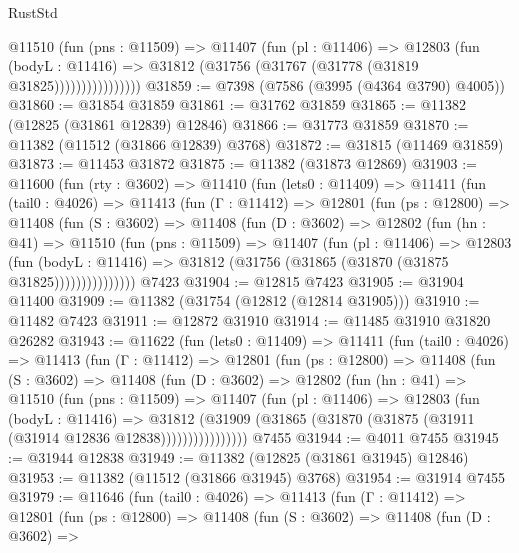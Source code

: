 \begin{lexlean}{RustStd}
\begin{coremodule}
                    @11510
                      (fun (pns : @11509) =>
                      @11407
                        (fun (pl : @11406) =>
                        @12803
                          (fun (bodyL : @11416) =>
                          @31812 (@31756 (@31767 (@31778 (@31819 @31825))))))))))))))))
@31859 := @7398 (@7586 (@3995 (@4364 @3790) @4005))
@31860 := @31854 @31859
@31861 := @31762 @31859
@31865 := @11382 (@12825 (@31861 @12839) @12846)
@31866 := @31773 @31859
@31870 := @11382 (@11512 (@31866 @12839) @3768)
@31872 := @31815 (@11469 @31859)
@31873 := @11453 @31872
@31875 := @11382 (@31873 @12869)
@31903 := @11600
    (fun (rty : @3602) =>
    @11410
      (fun (lets0 : @11409) =>
      @11411
        (fun (tail0 : @4026) =>
        @11413
          (fun (Γ : @11412) =>
          @12801
            (fun (ps : @12800) =>
            @11408
              (fun (S : @3602) =>
              @11408
                (fun (D : @3602) =>
                @12802
                  (fun (hn : @41) =>
                  @11510
                    (fun (pns : @11509) =>
                    @11407
                      (fun (pl : @11406) =>
                      @12803
                        (fun (bodyL : @11416) =>
                        @31812 (@31756 (@31865 (@31870 (@31875 @31825)))))))))))))))
    @7423
@31904 := @12815 @7423
@31905 := @31904 @11400
@31909 := @11382 (@31754 (@12812 (@12814 @31905)))
@31910 := @11482 @7423
@31911 := @12872 @31910
@31914 := @11485 @31910 @31820 @26282
@31943 := @11622
    (fun (lets0 : @11409) =>
    @11411
      (fun (tail0 : @4026) =>
      @11413
        (fun (Γ : @11412) =>
        @12801
          (fun (ps : @12800) =>
          @11408
            (fun (S : @3602) =>
            @11408
              (fun (D : @3602) =>
              @12802
                (fun (hn : @41) =>
                @11510
                  (fun (pns : @11509) =>
                  @11407
                    (fun (pl : @11406) =>
                    @12803
                      (fun (bodyL : @11416) =>
                      @31812
                        (@31909
                          (@31865 (@31870 (@31875 (@31911 (@31914 @12836 @12838))))))))))))))))
    @7455
@31944 := @4011 @7455
@31945 := @31944 @12838
@31949 := @11382 (@12825 (@31861 @31945) @12846)
@31953 := @11382 (@11512 (@31866 @31945) @3768)
@31954 := @31914 @7455
@31979 := @11646
    (fun (tail0 : @4026) =>
    @11413
      (fun (Γ : @11412) =>
      @12801
        (fun (ps : @12800) =>
        @11408
          (fun (S : @3602) =>
          @11408
            (fun (D : @3602) =>

\end{coremodule}
\end{lexlean}
